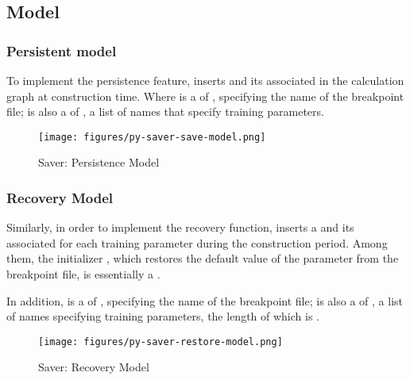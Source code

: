 \begin{content}
\subsection{Model}


\subsubsection{Persistent model}
To implement the persistence feature,  inserts  and its associated  in the calculation graph at construction time. Where  is a  of , specifying the name of the breakpoint file;  is also a  of  , a list of  names that specify training parameters.

\begin{figure}[!htbp]
  \centering
  \texttt{[image: figures/py-saver-save-model.png]}
  \caption{Saver: Persistence Model}
  \label{fig:py-saver-save-model}
\end{figure}


\subsubsection{Recovery Model}
Similarly, in order to implement the recovery function,  inserts a  and its associated  for each training parameter during the construction period. Among them, the initializer , which restores the default value of the parameter from the breakpoint file, is essentially a .

In addition,  is a  of , specifying the name of the breakpoint file;  is also a  of  , a list of  names specifying training parameters, the length of which is .

\begin{figure}[!htbp]
  \centering
  \texttt{[image: figures/py-saver-restore-model.png]}
  \caption{Saver: Recovery Model}
  \label{fig:py-saver-restore-model}
\end{figure}

\end{content}
